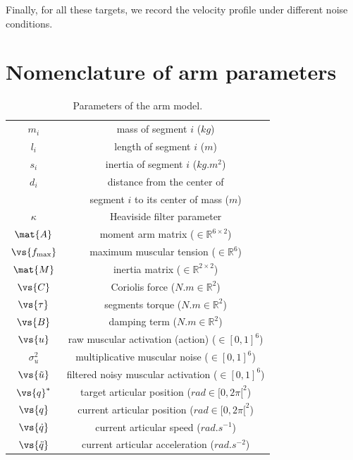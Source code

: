 \documentclass[10pt]{article}
\newcommand{\dq}{\vs{\dot{q}}}
\newcommand{\ddq}{\vs{\ddot{q}}}
\begin{document}
Finally, for all these targets, we record the velocity profile under different noise conditions.

\appendix

\section{Nomenclature of arm parameters}
\label{sec:nomen}

\begin{table}[hbt]
\caption{Parameters of the arm model.}
\begin{center}
\begin{tabular}{|c|c|}
\hline
$m_i$ & mass of segment $i$ ($kg$) \\
$l_i$ & length of segment $i$ ($m$) \\
$s_i$ & inertia of segment $i$ ($kg.m^2$) \\
$d_i$ & distance from the center of \\
      &  segment $i$ to its center of mass ($m$) \\
$\kappa$ & Heaviside filter parameter \\
$\mat{A}$ & moment arm matrix ($\in \mathbb{R}^{6 \times 2}$)\\
$\vs{f_{\max}}$ & maximum muscular tension ($\in \mathbb{R}^6$)\\
$\mat{M}$ & inertia matrix ($\in \mathbb{R}^{2 \times 2}$)\\
$\vs{C}$ & Coriolis force ($N.m \in \mathbb{R}^2$)\\
$\vs{\tau}$ & segments torque ($N.m \in \mathbb{R}^2$)\\
$\vs{B}$ & damping term ($N.m \in \mathbb{R}^2$)\\
$\vs{u}$ & raw muscular activation (action) ($\in [0,1]^6$)\\
$\sigma_u^2$ & multiplicative muscular noise ($\in [0,1]^6$)\\
$\vs{\tilde{u}}$ & filtered noisy muscular activation ($\in [0,1]^6$)\\
$\vs{q}^*$ & target articular position ($rad \in [0,2\pi[^2$)\\
$\vs{q}$ & current articular position ($rad \in [0,2\pi[^2$)\\
$\dq$ & current articular speed ($rad.s^{-1}$)\\
$\ddq$ & current articular acceleration ($rad.s^{-2}$)\\
\hline
\end{tabular}
\end{center}
\label{arm_model_params}
\end{table}


\end{document}

